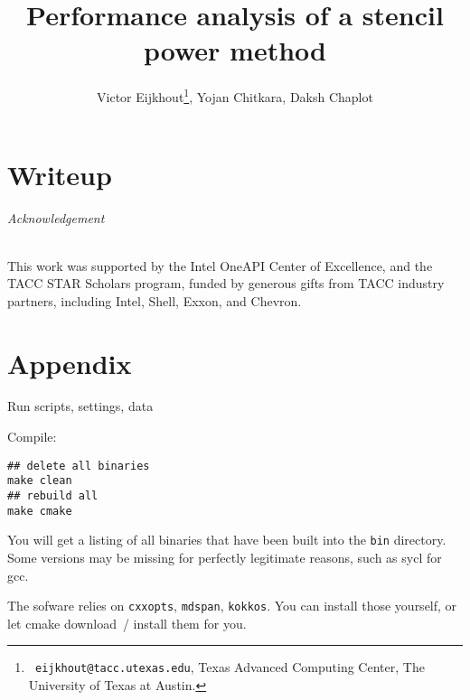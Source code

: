 \documentclass[11pt,fleqn]{artikel3}
\begin{document}
\title{Performance analysis of a stencil power method}
\author{Victor Eijkhout\thanks{{\tt
      eijkhout@tacc.utexas.edu}, Texas Advanced Computing Center, The
    University of Texas at Austin.
  }, Yojan Chitkara, Daksh Chaplot}
\maketitle

\part{Writeup}



\paragraph*{Acknowledgement}
This work was supported by
the Intel OneAPI Center of Excellence, and the 
TACC STAR Scholars program,
funded by generous gifts from TACC industry partners, including Intel, Shell, Exxon, and Chevron.

\part{Appendix}

 {Run scripts, settings, data}

Compile:
\begin{lstlisting}
## delete all binaries
make clean
## rebuild all
make cmake
\end{lstlisting}
You will get a listing of all binaries that have been built
into the \lstinline{bin} directory.
Some versions may be missing for perfectly legitimate reasons,
such as sycl for gcc.

The sofware relies on \lstinline{cxxopts}, \lstinline{mdspan}, \lstinline{kokkos}.
You can install those yourself, or let cmake download~/ install them for you.
\end{document}
